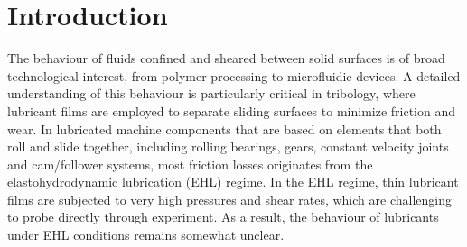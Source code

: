 \documentclass[aps,prb,reprint,superscriptaddress, a4paper]{revtex4-1}
\begin{document}
\pacs{}

\maketitle


\section{Introduction}

The behaviour of fluids confined and sheared between solid surfaces is of broad technological interest, from polymer processing to microfluidic devices. A detailed understanding of this behaviour is particularly critical in tribology, where lubricant films are employed to separate sliding surfaces to minimize friction and wear. In lubricated machine components that are based on elements that both roll and slide together, including rolling bearings, gears, constant velocity joints and cam/follower systems, most friction losses originates from the elastohydrodynamic lubrication (EHL) regime. In the EHL regime, thin lubricant films are subjected to very high pressures and shear rates, which are challenging to probe directly through experiment. As a result, the behaviour of lubricants under EHL conditions remains somewhat unclear\cite{Spikes2014}.
\end{document}
